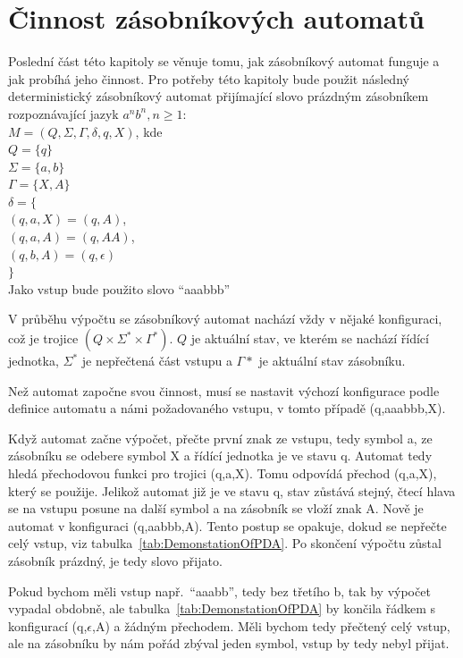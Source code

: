 \section{Činnost zásobníkových automatů}

Poslední část této kapitoly se věnuje tomu, jak zásobníkový automat funguje a jak probíhá jeho činnost. Pro potřeby této kapitoly bude použit následný deterministický zásobníkový automat přijímající slovo prázdným zásobníkem rozpoznávající jazyk $a^{n}b^{n}, n \ge 1$:\\
$M = (Q, \Sigma, \Gamma, \delta, q, X)$, kde \\
\indent$Q = \{q\}$\\
\indent$\Sigma = \{a,b\}$\\
\indent$\Gamma = \{X,A\}$\\
\indent$\delta = \{$\\
\indent\indent$(q,a,X) = (q,A)$,\\
\indent\indent$(q,a,A) = (q,AA)$,\\
\indent\indent$(q,b,A) = (q,\epsilon)$\\
\indent$\}$\\
Jako vstup bude použito slovo ``aaabbb''

V průběhu výpočtu se zásobníkový automat nachází vždy v nějaké konfiguraci, což je trojice $(Q \times \Sigma^{*} \times \Gamma^{*})$. $Q$ je aktuální stav, ve kterém se nachází řídící jednotka, $\Sigma^{*}$ je nepřečtená část vstupu a $\Gamma{*}$ je aktuální stav zásobníku. 

Než automat započne svou činnost, musí se nastavit výchozí konfigurace podle definice automatu a námi požadovaného vstupu, v tomto případě (q,aaabbb,X). 

Když automat začne výpočet, přečte první znak ze vstupu, tedy symbol a, ze zásobníku se odebere symbol X a řídící jednotka je ve stavu q. Automat tedy hledá přechodovou funkci pro trojici (q,a,X). Tomu odpovídá přechod (q,a,X), který se použije. Jelikož automat již je ve stavu q, stav zůstává stejný, čtecí hlava se na vstupu posune na další symbol a na zásobník se vloží znak A. Nově je automat v konfiguraci (q,aabbb,A). Tento postup se opakuje, dokud se nepřečte celý vstup, viz tabulka~\ref{tab:DemonstationOfPDA}. Po skončení výpočtu zůstal zásobník prázdný, je tedy slovo přijato. 

Pokud bychom měli vstup např.\ ``aaabb'', tedy bez třetího b, tak by výpočet vypadal obdobně, ale tabulka~\ref{tab:DemonstationOfPDA} by končila řádkem s konfigurací (q,$\epsilon$,A) a žádným přechodem. Měli bychom tedy přečtený celý vstup, ale na zásobníku by nám pořád zbýval jeden symbol, vstup by tedy nebyl přijat.

